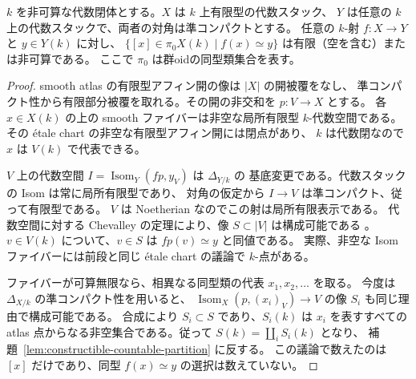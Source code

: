 \begin{proposition}[同型類ファイバーの濃度]\label{prop:iso-fiber-cardinality}
$k$ を非可算な代数閉体とする。$X$ は $k$ 上有限型の代数スタック、
$Y$ は任意の $k$ 上の代数スタックで、両者の対角は準コンパクトとする。
任意の $k$-射 $f:X\to Y$ と $y\in Y(k)$ に対し、
$\{[x]\in\pi_0 X(k)\mid f(x)\simeq y\}$ は有限（空を含む）または非可算である。
ここで $\pi_0$ は群oidの同型類集合を表す。
\end{proposition}
\begin{proof}
smooth atlas の有限型アフィン開の像は $|X|$ の開被覆をなし、
準コンパクト性から有限部分被覆を取れる。その開の非交和を $p:V\to X$ とする。
各 $x\in X(k)$ の上の smooth ファイバーは非空な局所有限型 $k$-代数空間である。
その étale chart の非空な有限型アフィン開には閉点があり、
$k$ は代数閉なので $x$ は $V(k)$ で代表できる。

$V$ 上の代数空間 $I=\operatorname{Isom}_Y(fp,y_V)$ は $\Delta_{Y/k}$ の
基底変更である。代数スタックの Isom は常に局所有限型であり、
対角の仮定から $I\to V$ は準コンパクト、従って有限型である。
$V$ は Noetherian なのでこの射は局所有限表示である。
代数空間に対する Chevalley の定理により、像 $S\subset |V|$ は構成可能である
\cite[Tags 04XQ, 0ECX]{StacksSmoothAtlas}。
$v\in V(k)$ について、$v\in S$ は $fp(v)\simeq y$ と同値である。
実際、非空な Isom ファイバーには前段と同じ étale chart の議論で $k$-点がある。

ファイバーが可算無限なら、相異なる同型類の代表 $x_1,x_2,\ldots$ を取る。
今度は $\Delta_{X/k}$ の準コンパクト性を用いると、
$\operatorname{Isom}_X(p,(x_i)_V)\to V$ の像 $S_i$ も同じ理由で構成可能である。
合成により $S_i\subset S$ であり、$S_i(k)$ は $x_i$ を表すすべての
atlas 点からなる非空集合である。従って $S(k)=\coprod_i S_i(k)$ となり、
補題~\ref{lem:constructible-countable-partition} に反する。
この議論で数えたのは $[x]$ だけであり、同型 $f(x)\simeq y$ の選択は数えていない。
\end{proof}

